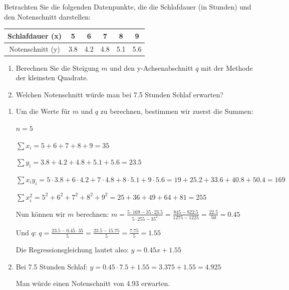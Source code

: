 \begin{mychallenge}
    Betrachten Sie die folgenden Datenpunkte, die die Schlafdauer (in Stunden) und den Notenschnitt darstellen:
    \begin{center}
        \begin{tabular}{c||c|c|c|c|c}
            Schlafdauer (x) & 5 & 6 & 7 & 8 & 9 \\\midrule
            Notenschnitt (y) & 3.8 & 4.2 & 4.8 & 5.1 & 5.6 
        \end{tabular}
    \end{center}
    
    \begin{enumerate}
        \item Berechnen Sie die Steigung $m$ und den y-Achsenabschnitt $q$ mit der Methode der kleinsten Quadrate.
        \item Welchen Notenschnitt würde man bei 7.5 Stunden Schlaf erwarten?
    \end{enumerate}
    
    \begin{myanswer}
        \begin{enumerate}
            \item Um die Werte für $m$ und $q$ zu berechnen, bestimmen wir zuerst die Summen:
            
            $n = 5$
            
            $\sum x_i = 5 + 6 + 7 + 8 + 9 = 35$
            
            $\sum y_i = 3.8 + 4.2 + 4.8 + 5.1 + 5.6 = 23.5$
            
            $\sum x_i y_i = 5 \cdot 3.8 + 6 \cdot 4.2 + 7 \cdot 4.8 + 8 \cdot 5.1 + 9 \cdot 5.6 = 19 + 25.2 + 33.6 + 40.8 + 50.4 = 169$
            
            $\sum x_i^2 = 5^2 + 6^2 + 7^2 + 8^2 + 9^2 = 25 + 36 + 49 + 64 + 81 = 255$
            
            Nun können wir $m$ berechnen:
            $m = \frac{5 \cdot 169 - 35 \cdot 23.5}{5 \cdot 255 - 35^2} = \frac{845 - 822.5}{1275 - 1225} = \frac{22.5}{50} = 0.45$
            
            Und $q$:
            $q = \frac{23.5 - 0.45 \cdot 35}{5} = \frac{23.5 - 15.75}{5} = \frac{7.75}{5} = 1.55$
            
            Die Regressionsgleichung lautet also: $y = 0.45x + 1.55$
            
            \item Bei 7.5 Stunden Schlaf: $y = 0.45 \cdot 7.5 + 1.55 = 3.375 + 1.55 = 4.925$
            
            Man würde einen Notenschnitt von 4.93 erwarten.
        \end{enumerate}
    \end{myanswer}
\end{mychallenge}

